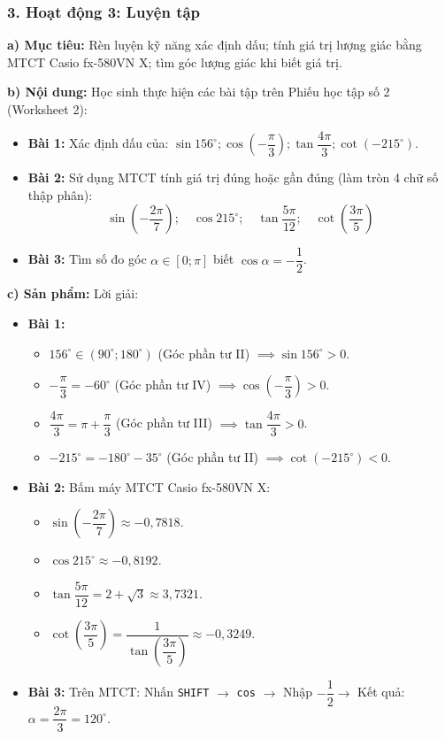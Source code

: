 \documentclass[12pt, a4paper]{article}
\begin{document}
\subsubsection*{3. Hoạt động 3: Luyện tập}
\textbf{a) Mục tiêu:} Rèn luyện kỹ năng xác định dấu; tính giá trị lượng giác bằng MTCT Casio fx-580VN X; tìm góc lượng giác khi biết giá trị.

\textbf{b) Nội dung:} Học sinh thực hiện các bài tập trên Phiếu học tập số 2 (Worksheet 2):
\begin{itemize}[leftmargin=0.6cm]
    \item \textbf{Bài 1:} Xác định dấu của: $\sin 156^\circ; \cos\left(-\dfrac{\pi}{3}\right); \tan\dfrac{4\pi}{3}; \cot\left(-215^\circ\right)$.
    \item \textbf{Bài 2:} Sử dụng MTCT tính giá trị đúng hoặc gần đúng (làm tròn 4 chữ số thập phân):
    $$\sin\left(-\dfrac{2\pi}{7}\right); \quad \cos 215^\circ; \quad \tan\dfrac{5\pi}{12}; \quad \cot\left(\dfrac{3\pi}{5}\right)$$
    \item \textbf{Bài 3:} Tìm số đo góc $\alpha \in [0; \pi]$ biết $\cos\alpha = -\dfrac{1}{2}$.
\end{itemize}

\textbf{c) Sản phẩm:} Lời giải:
\begin{itemize}[leftmargin=0.6cm]
    \item \textbf{Bài 1:}
    \begin{itemize}[leftmargin=0.5cm]
        \item $156^\circ \in (90^\circ; 180^\circ)$ (Góc phần tư II) $\implies \sin 156^\circ > 0$.
        \item $-\dfrac{\pi}{3} = -60^\circ$ (Góc phần tư IV) $\implies \cos\left(-\dfrac{\pi}{3}\right) > 0$.
        \item $\dfrac{4\pi}{3} = \pi + \dfrac{\pi}{3}$ (Góc phần tư III) $\implies \tan\dfrac{4\pi}{3} > 0$.
        \item $-215^\circ = -180^\circ - 35^\circ$ (Góc phần tư II) $\implies \cot\left(-215^\circ\right) < 0$.
    \end{itemize}
    \item \textbf{Bài 2:} Bấm máy MTCT Casio fx-580VN X:
    \begin{itemize}[leftmargin=0.5cm]
        \item $\sin\left(-\dfrac{2\pi}{7}\right) \approx -0{,}7818$.
        \item $\cos 215^\circ \approx -0{,}8192$.
        \item $\tan\dfrac{5\pi}{12} = 2 + \sqrt{3} \approx 3{,}7321$.
        \item $\cot\left(\dfrac{3\pi}{5}\right) = \dfrac{1}{\tan\left(\dfrac{3\pi}{5}\right)} \approx -0{,}3249$.
    \end{itemize}
    \item \textbf{Bài 3:} Trên MTCT: Nhấn \texttt{SHIFT} $\to$ \texttt{cos} $\to$ Nhập $-\dfrac{1}{2} \to$ Kết quả: $\alpha = \dfrac{2\pi}{3} = 120^\circ$.
\end{itemize}
\end{document}
